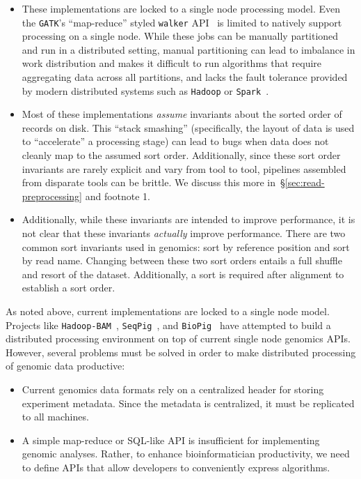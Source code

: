 \documentclass[phd]{ucbthesis}
\begin{document}
\begin{itemize}
\item These implementations are locked to a single node processing model. Even the \texttt{GATK}'s
``map-reduce'' styled \texttt{walker} API~\cite{mckenna10} is limited to natively support processing on
a single node. While these jobs can be manually partitioned and run in a distributed setting, manual
partitioning can lead to imbalance in work distribution and makes it difficult to run algorithms that
require aggregating data across all partitions, and lacks the fault tolerance provided by modern
distributed systems such as \texttt{Hadoop} or \texttt{Spark}~\cite{zaharia12}.
\item Most of these implementations \emph{assume} invariants about the sorted order of records on
disk. This ``stack smashing'' (specifically, the layout of data is used to ``accelerate'' a processing stage)
can lead to bugs when data does not cleanly map to the assumed sort order. Additionally, since these
sort order invariants are rarely explicit and vary from tool to tool, pipelines assembled from disparate
tools can be brittle. We discuss this more in~\S\ref{sec:read-preprocessing} and footnote 1.
\item Additionally, while these invariants are intended to improve performance, it is not clear that these
invariants \emph{actually} improve performance. There are two common sort invariants used in genomics:
sort by reference position and sort by read name. Changing between these two sort orders entails
a full shuffle and resort of the dataset. Additionally, a sort is required after alignment to establish a sort order.
\end{itemize}

As noted above, current implementations are locked to a single node model. Projects like
\texttt{Hadoop-BAM}~\cite{niemenmaa12}, \texttt{SeqPig}~\cite{schumacher14}, and \texttt{BioPig}~\cite{nordberg13}
have attempted to build a distributed processing environment on top of current single node genomics APIs.
However, several problems must be solved in order to make distributed processing of genomic data productive:

\begin{itemize}
\item Current genomics data formats rely on a centralized header for storing experiment metadata. Since the
metadata is centralized, it must be replicated to all machines.
\item A simple map-reduce or SQL-like API is insufficient for implementing genomic analyses. Rather, to enhance
bioinformatician productivity, we need to define APIs that allow developers to conveniently express algorithms.
\end{itemize}
\end{document}
